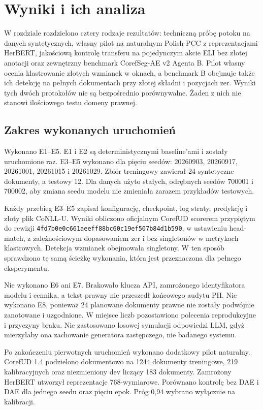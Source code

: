 \chapter{Wyniki i ich analiza}
\label{chap:wyniki}

W rozdziale rozdzielono cztery rodzaje rezultatów: techniczną próbę potoku na danych syntetycznych, własny pilot na naturalnym Polish-PCC z reprezentacjami HerBERT, jakościową kontrolę transferu na pojedynczym akcie ELI bez złotej anotacji oraz zewnętrzny benchmark CorefSeg-AE v2 Agenta B. Pilot własny ocenia klastrowanie złotych wzmianek w oknach, a benchmark B obejmuje także ich detekcję na pełnych dokumentach przy złotej składni i pozycjach zer. Wyniki tych dwóch protokołów nie są bezpośrednio porównywalne. Żaden z nich nie stanowi ilościowego testu domeny prawnej.

\section{Zakres wykonanych uruchomień}
\label{sec:zakres-wynikow}

Wykonano E1--E5. E1 i E2 są deterministycznymi baseline’ami i zostały uruchomione raz. E3--E5 wykonano dla pięciu seedów: 20260903, 20260917, 20261001, 20261015 i 20261029. Zbiór treningowy zawierał 24 syntetyczne dokumenty, a testowy 12. Dla danych użyto stałych, odrębnych seedów 700001 i 700002, aby zmiana seedu modelu nie zmieniała zarazem przykładów testowych.

Każdy przebieg E3--E5 zapisał konfigurację, checkpoint, log straty, predykcję i złoty plik CoNLL-U. Wyniki obliczono oficjalnym CorefUD scorerem przypiętym do rewizji \texttt{4fd7b0e0c661aeeff88bc60c19ef507b84d1b590}, w ustawieniu head-match, z zależnościowym dopasowaniem zer i bez singletonów w metrykach klastrowych. Detekcja wzmianek obejmowała singletony. W ten sposób sprawdzono tę samą ścieżkę wykonania, która jest przeznaczona dla pełnego eksperymentu.

Nie wykonano E6 ani E7. Brakowało klucza API, zamrożonego identyfikatora modelu i cennika, a tekst prawny nie przeszedł końcowego audytu PII. Nie wykonano E8, ponieważ 24 planowane dokumenty prawne nie zostały podwójnie zanotowane i uzgodnione. W miejsce liczb pozostawiono polecenia reprodukcyjne i przyczyny braku. Nie zastosowano losowej symulacji odpowiedzi LLM, gdyż mierzyłaby ona zachowanie generatora zastępczego, nie badanego systemu.

Po zakończeniu pierwotnych uruchomień wykonano dodatkowy pilot naturalny. CorefUD 1.4 podzielono dokumentowo na 1244 dokumenty treningowe, 219 kalibracyjnych oraz niezmieniony dev liczący 183 dokumenty. Zamrożony HerBERT utworzył reprezentacje 768-wymiarowe. Porównano kontrolę bez DAE i DAE dla jednego seedu oraz pięciu epok. Próg 0,94 wybrano wyłącznie na kalibracji.

